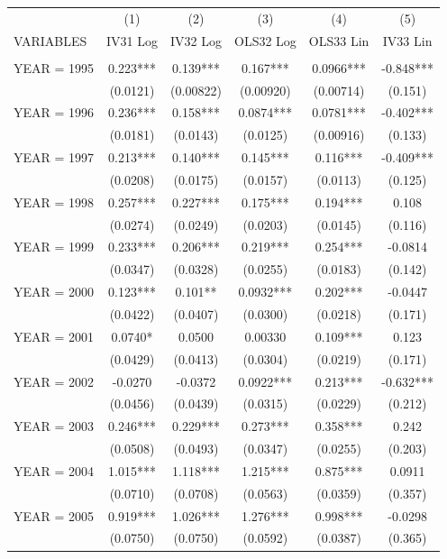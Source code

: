 \begin{tabular}{lccccc} \hline
 & (1) & (2) & (3) & (4) & (5) \\
VARIABLES & IV31 Log & IV32 Log & OLS32 Log & OLS33 Lin & IV33 Lin \\ \hline
 &  &  &  &  &  \\
YEAR = 1995 & 0.223*** & 0.139*** & 0.167*** & 0.0966*** & -0.848*** \\
 & (0.0121) & (0.00822) & (0.00920) & (0.00714) & (0.151) \\
YEAR = 1996 & 0.236*** & 0.158*** & 0.0874*** & 0.0781*** & -0.402*** \\
 & (0.0181) & (0.0143) & (0.0125) & (0.00916) & (0.133) \\
YEAR = 1997 & 0.213*** & 0.140*** & 0.145*** & 0.116*** & -0.409*** \\
 & (0.0208) & (0.0175) & (0.0157) & (0.0113) & (0.125) \\
YEAR = 1998 & 0.257*** & 0.227*** & 0.175*** & 0.194*** & 0.108 \\
 & (0.0274) & (0.0249) & (0.0203) & (0.0145) & (0.116) \\
YEAR = 1999 & 0.233*** & 0.206*** & 0.219*** & 0.254*** & -0.0814 \\
 & (0.0347) & (0.0328) & (0.0255) & (0.0183) & (0.142) \\
YEAR = 2000 & 0.123*** & 0.101** & 0.0932*** & 0.202*** & -0.0447 \\
 & (0.0422) & (0.0407) & (0.0300) & (0.0218) & (0.171) \\
YEAR = 2001 & 0.0740* & 0.0500 & 0.00330 & 0.109*** & 0.123 \\
 & (0.0429) & (0.0413) & (0.0304) & (0.0219) & (0.171) \\
YEAR = 2002 & -0.0270 & -0.0372 & 0.0922*** & 0.213*** & -0.632*** \\
 & (0.0456) & (0.0439) & (0.0315) & (0.0229) & (0.212) \\
YEAR = 2003 & 0.246*** & 0.229*** & 0.273*** & 0.358*** & 0.242 \\
 & (0.0508) & (0.0493) & (0.0347) & (0.0255) & (0.203) \\
YEAR = 2004 & 1.015*** & 1.118*** & 1.215*** & 0.875*** & 0.0911 \\
 & (0.0710) & (0.0708) & (0.0563) & (0.0359) & (0.357) \\
YEAR = 2005 & 0.919*** & 1.026*** & 1.276*** & 0.998*** & -0.0298 \\
 & (0.0750) & (0.0750) & (0.0592) & (0.0387) & (0.365) \\

\end{tabular}
